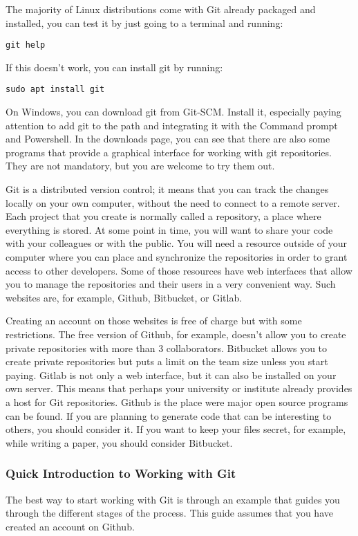 The majority of Linux distributions come with Git already packaged and installed, you can test it by just going to a terminal and running:
\begin{verbatim}
git help
\end{verbatim}
If this doesn’t work, you can install git by running:
\begin{verbatim}
sudo apt install git
\end{verbatim}

On Windows, you can download git from Git-SCM. Install it, especially paying attention to add git to the path and integrating it with the Command prompt and Powershell. In the downloads page, you can see that there are also some programs that provide a graphical interface for working with git repositories. They are not mandatory, but you are welcome to try them out.

Git is a distributed version control; it means that you can track the changes locally on your own computer, without the need to connect to a remote server. Each project that you create is normally called a repository, a place where everything is stored. At some point in time, you will want to share your code with your colleagues or with the public. You will need a resource outside of your computer where you can place and synchronize the repositories in order to grant access to other developers. Some of those resources have web interfaces that allow you to manage the repositories and their users in a very convenient way. Such websites are, for example, Github, Bitbucket, or Gitlab.

Creating an account on those websites is free of charge but with some restrictions. The free version of Github, for example, doesn’t allow you to create private repositories with more than 3 collaborators. Bitbucket allows you to create private repositories but puts a limit on the team size unless you start paying. Gitlab is not only a web interface, but it can also be installed on your own server. This means that perhaps your university or institute already provides a host for Git repositories. Github is the place were major open source programs can be found. If you are planning to generate code that can be interesting to others, you should consider it. If you want to keep your files secret, for example, while writing a paper, you should consider Bitbucket.

\subsubsection{Quick Introduction to Working with Git}
The best way to start working with Git is through an example that guides you through the different stages of the process. This guide assumes that you have created an account on Github.

